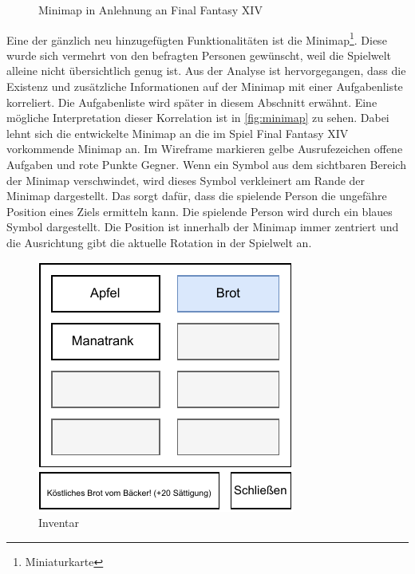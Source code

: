 \begin{figure}[H]%
    \centering
    \qquad
    \caption{Minimap in Anlehnung an Final Fantasy XIV}%
    \label{fig:minimap}%
\end{figure}

Eine der gänzlich neu hinzugefügten Funktionalitäten ist die Minimap\footnote{Miniaturkarte}. Diese wurde sich vermehrt von den befragten Personen gewünscht, weil die Spielwelt alleine nicht übersichtlich genug ist. Aus der Analyse ist hervorgegangen, dass die Existenz und zusätzliche Informationen auf der Minimap mit einer Aufgabenliste korreliert. Die Aufgabenliste wird später in diesem Abschnitt erwähnt. Eine mögliche Interpretation dieser Korrelation ist in \autoref{fig:minimap} zu sehen. Dabei lehnt sich die entwickelte Minimap an die im Spiel Final Fantasy XIV vorkommende Minimap an. Im Wireframe markieren gelbe Ausrufezeichen offene Aufgaben und rote Punkte Gegner. Wenn ein Symbol aus dem sichtbaren Bereich der Minimap verschwindet, wird dieses Symbol verkleinert am Rande der Minimap dargestellt. Das sorgt dafür, dass die spielende Person die ungefähre Position eines Ziels ermitteln kann. Die spielende Person wird durch ein blaues Symbol dargestellt. Die Position ist innerhalb der Minimap immer zentriert und die Ausrichtung gibt die aktuelle Rotation in der Spielwelt an. 

\begin{figure}[H]
\centering
\includegraphics[width=0.5\columnwidth]{figures/wireframes/inventory.pdf}
\caption{\label{fig:inventory}Inventar}
\end{figure}

